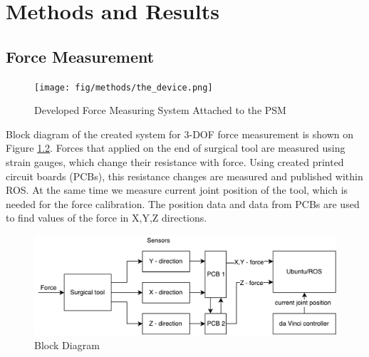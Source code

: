 \chapter{Methods and Results}
\label{methods} %

\section{Force Measurement}
\label{sec:sysArch}

\begin{figure}[h]
	\begin{center}
	\texttt{[image: fig/methods/the\_device.png]}
	\end{center}
	\vspace{-4mm}
	\caption[Developed Force Measuring System Attached to the PSM]
	{Developed Force Measuring System Attached to the PSM}
	\label{fig:PSM_with_FF}
	\vspace{-2mm}
\end{figure}

Block diagram of the created system for 3-DOF force measurement is shown on Figure \ref{fig:BlockDiag}. Forces that applied on the end of surgical tool are measured using strain gauges, which change their resistance with force. Using created printed circuit boards (PCBs), this resistance changes are measured and published within ROS. At the same time we measure current joint position of the tool, which is needed for the force calibration. The position data and data from PCBs are used to find values of the force in X,Y,Z directions.

\begin{figure}[h]
	\begin{center}
		\includegraphics[width=140mm]{fig/methods/dbd2.pdf}
	\end{center}
	\vspace{-4mm}
	\caption[Block Diagram]
	{Block Diagram}
	\label{fig:BlockDiag}
	\vspace{-2mm}
\end{figure}

